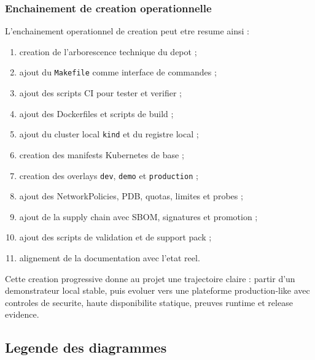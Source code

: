 \subsubsection{Enchainement de creation operationnelle}

L'enchainement operationnel de creation peut etre resume ainsi :

\begin{enumerate}
  \item creation de l'arborescence technique du depot ;
  \item ajout du \texttt{Makefile} comme interface de commandes ;
  \item ajout des scripts CI pour tester et verifier ;
  \item ajout des Dockerfiles et scripts de build ;
  \item ajout du cluster local \texttt{kind} et du registre local ;
  \item creation des manifests Kubernetes de base ;
  \item creation des overlays \texttt{dev}, \texttt{demo} et
  \texttt{production} ;
  \item ajout des NetworkPolicies, PDB, quotas, limites et probes ;
  \item ajout de la supply chain avec SBOM, signatures et promotion ;
  \item ajout des scripts de validation et de support pack ;
  \item alignement de la documentation avec l'etat reel.
\end{enumerate}

Cette creation progressive donne au projet une trajectoire claire : partir d'un
demonstrateur local stable, puis evoluer vers une plateforme production-like
avec controles de securite, haute disponibilite statique, preuves runtime et
release evidence.

\subsection{Legende des diagrammes}


